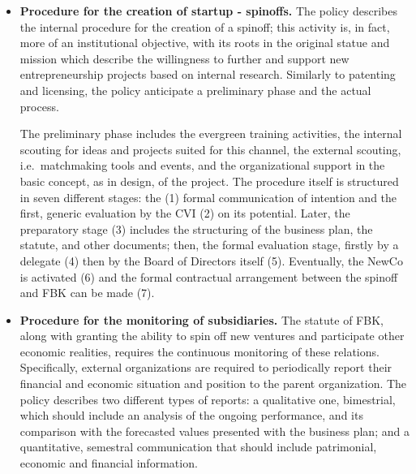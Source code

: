 \begin{itemize}
\item \textbf{Procedure for the creation of startup - spinoffs.} The policy describes the internal procedure for the creation of a spinoff; this activity is, in fact, more of an institutional objective, with its roots in the original statue and mission which describe the willingness to further and support new entrepreneurship projects based on internal research. Similarly to patenting and licensing, the policy anticipate a preliminary phase and the actual process.

The preliminary phase includes the evergreen training activities, the internal scouting for ideas and projects suited for this channel, the external scouting, i.e.\ matchmaking tools and events, and the organizational support in the basic concept, as in design, of the project. The procedure itself is structured in seven different stages: the (1) formal communication of intention and the first, generic evaluation by the CVI (2) on its potential. Later, the preparatory stage (3) includes the structuring of the business plan, the statute, and other documents; then, the formal evaluation stage, firstly by a delegate (4) then by the Board of Directors itself (5). Eventually, the NewCo is activated (6) and the formal contractual arrangement between the spinoff and FBK can be made (7).

\item \textbf{Procedure for the monitoring of subsidiaries.} The statute of FBK, along with granting the ability to spin off new ventures and participate other economic realities, requires the continuous monitoring of these relations. Specifically, external organizations are required to periodically report their financial and economic situation and position to the parent organization. The policy describes two different types of reports: a qualitative one, bimestrial, which should include an analysis of the ongoing performance, and its comparison with the forecasted values presented with the business plan; and a quantitative, semestral communication that should include patrimonial, economic and financial information.

\end{itemize} 
